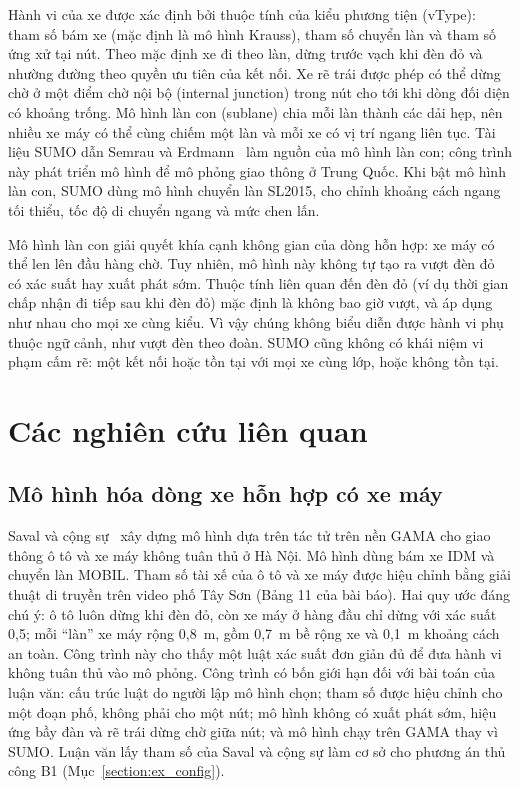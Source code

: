 \documentclass[../main.tex]{subfiles}
\begin{document}
Hành vi của xe được xác định bởi thuộc tính của kiểu phương tiện (vType): tham số bám xe (mặc định là mô hình Krauss), tham số chuyển làn và tham số ứng xử tại nút. Theo mặc định xe đi theo làn, dừng trước vạch khi đèn đỏ và nhường đường theo quyền ưu tiên của kết nối. Xe rẽ trái được phép có thể dừng chờ ở một điểm chờ nội bộ (internal junction) trong nút cho tới khi dòng đối diện có khoảng trống. Mô hình làn con (sublane) chia mỗi làn thành các dải hẹp, nên nhiều xe máy có thể cùng chiếm một làn và mỗi xe có vị trí ngang liên tục. Tài liệu SUMO dẫn Semrau và Erdmann~\cite{semrau2016chinese} làm nguồn của mô hình làn con; công trình này phát triển mô hình để mô phỏng giao thông ở Trung Quốc. Khi bật mô hình làn con, SUMO dùng mô hình chuyển làn SL2015, cho chỉnh khoảng cách ngang tối thiểu, tốc độ di chuyển ngang và mức chen lấn.

Mô hình làn con giải quyết khía cạnh không gian của dòng hỗn hợp: xe máy có thể len lên đầu hàng chờ. Tuy nhiên, mô hình này không tự tạo ra vượt đèn đỏ có xác suất hay xuất phát sớm. Thuộc tính liên quan đến đèn đỏ (ví dụ thời gian chấp nhận đi tiếp sau khi đèn đỏ) mặc định là không bao giờ vượt, và áp dụng như nhau cho mọi xe cùng kiểu. Vì vậy chúng không biểu diễn được hành vi phụ thuộc ngữ cảnh, như vượt đèn theo đoàn. SUMO cũng không có khái niệm vi phạm cấm rẽ: một kết nối hoặc tồn tại với mọi xe cùng lớp, hoặc không tồn tại.

\section{Các nghiên cứu liên quan}
\label{section:2.1}

\subsection{Mô hình hóa dòng xe hỗn hợp có xe máy}
\label{subsection:2.1.2}

Saval và cộng sự~\cite{saval2023mixed} xây dựng mô hình dựa trên tác tử trên nền GAMA cho giao thông ô tô và xe máy không tuân thủ ở Hà Nội. Mô hình dùng bám xe IDM và chuyển làn MOBIL. Tham số tài xế của ô tô và xe máy được hiệu chỉnh bằng giải thuật di truyền trên video phố Tây Sơn (Bảng 11 của bài báo). Hai quy ước đáng chú ý: ô tô luôn dừng khi đèn đỏ, còn xe máy ở hàng đầu chỉ dừng với xác suất 0,5; mỗi ``làn'' xe máy rộng 0,8~m, gồm 0,7~m bề rộng xe và 0,1~m khoảng cách an toàn. Công trình này cho thấy một luật xác suất đơn giản đủ để đưa hành vi không tuân thủ vào mô phỏng. Công trình có bốn giới hạn đối với bài toán của luận văn: cấu trúc luật do người lập mô hình chọn; tham số được hiệu chỉnh cho một đoạn phố, không phải cho một nút; mô hình không có xuất phát sớm, hiệu ứng bầy đàn và rẽ trái dừng chờ giữa nút; và mô hình chạy trên GAMA thay vì SUMO. Luận văn lấy tham số của Saval và cộng sự làm cơ sở cho phương án thủ công B1 (Mục~\ref{section:ex_config}).
\end{document}
